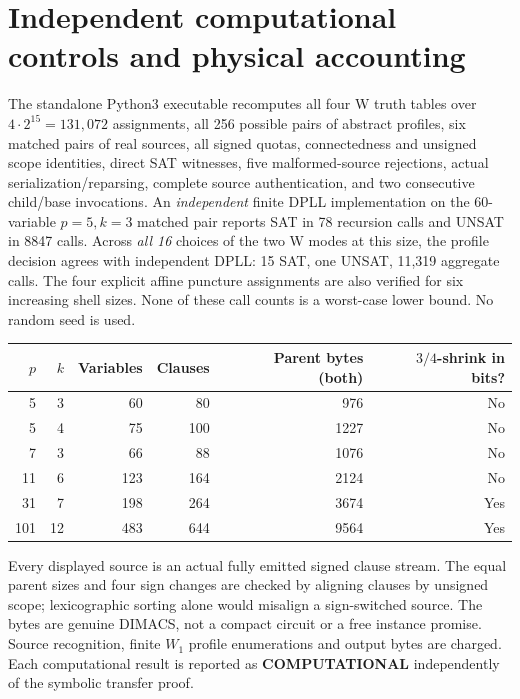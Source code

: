 \documentclass[11pt]{article}
\begin{document}
\section{Independent computational controls and physical accounting}
The standalone Python3 executable recomputes all four W truth tables over $4\cdot2^{15}=131{,}072$ assignments, all 256 possible pairs of abstract profiles, six matched pairs of real sources, all signed quotas, connectedness and unsigned scope identities, direct SAT witnesses, five malformed-source rejections, actual serialization/reparsing, complete source authentication, and two consecutive child/base invocations. An \emph{independent} finite DPLL implementation on the 60-variable $p=5,k=3$ matched pair reports SAT in 78 recursion calls and UNSAT in 8847 calls. Across \emph{all 16} choices of the two W modes at this size, the profile decision agrees with independent DPLL: 15 SAT, one UNSAT, 11,319 aggregate calls. The four explicit affine puncture assignments are also verified for six increasing shell sizes. None of these call counts is a worst-case lower bound. No random seed is used.
\begin{center}\small\begin{tabular}{rrrrrr}\toprule
$p$ & $k$ & Variables & Clauses & Parent bytes (both) & $3/4$-shrink in bits?\\\midrule
5&3&60&80&976&No\\
5&4&75&100&1227&No\\
7&3&66&88&1076&No\\
11&6&123&164&2124&No\\
31&7&198&264&3674&Yes\\
101&12&483&644&9564&Yes\\\bottomrule
\end{tabular}\end{center}
Every displayed source is an actual fully emitted signed clause stream. The equal parent sizes and four sign changes are checked by aligning clauses by unsigned scope; lexicographic sorting alone would misalign a sign-switched source. The bytes are genuine DIMACS, not a compact circuit or a free instance promise. Source recognition, finite $W_1$ profile enumerations and output bytes are charged. Each computational result is reported as \textbf{COMPUTATIONAL} independently of the symbolic transfer proof.
\end{document}
